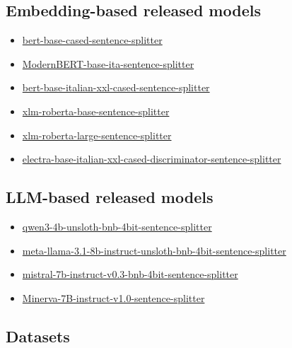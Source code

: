 \documentclass[11pt]{article}
\begin{document}
\subsection{Embedding-based released models}

 \begin{itemize}
 \item \href{https://huggingface.co/fax4ever/bert-base-cased-sentence-splitter}{bert-base-cased-sentence-splitter}
 \item \href{https://huggingface.co/fax4ever/ModernBERT-base-ita-sentence-splitter}{ModernBERT-base-ita-sentence-splitter}
 \item \href{https://huggingface.co/fax4ever/bert-base-italian-xxl-cased-sentence-splitter}{bert-base-italian-xxl-cased-sentence-splitter}
 \item \href{https://huggingface.co/fax4ever/xlm-roberta-base-sentence-splitter}{xlm-roberta-base-sentence-splitter}
 \item \href{https://huggingface.co/fax4ever/xlm-roberta-large-sentence-splitter}{xlm-roberta-large-sentence-splitter}
 \item \href{https://huggingface.co/fax4ever/electra-base-italian-xxl-cased-discriminator-sentence-splitter}{electra-base-italian-xxl-cased-discriminator-sentence-splitter}
\end{itemize}

\subsection{LLM-based released models}

\begin{itemize}
	\item 
	\href{https://huggingface.co/fax4ever/qwen3-4b-unsloth-bnb-4bit-sentence-splitter}{qwen3-4b-unsloth-bnb-4bit-sentence-splitter}
	\item 
	\href{https://huggingface.co/fax4ever/meta-llama-3.1-8b-instruct-unsloth-bnb-4bit-sentence-splitter}{meta-llama-3.1-8b-instruct-unsloth-bnb-4bit-sentence-splitter}
	\item \href{https://huggingface.co/fax4ever/mistral-7b-instruct-v0.3-bnb-4bit-sentence-splitter}{mistral-7b-instruct-v0.3-bnb-4bit-sentence-splitter}
	\item \href{https://huggingface.co/fax4ever/Minerva-7B-instruct-v1.0-sentence-splitter}{Minerva-7B-instruct-v1.0-sentence-splitter}
\end{itemize}

\subsection{Datasets}
\end{document}
